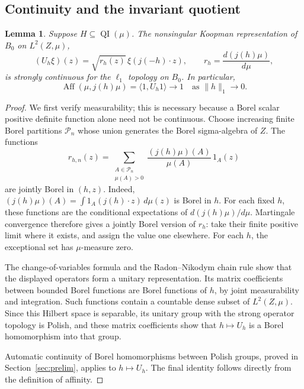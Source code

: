 \documentclass[11pt]{article}
\newtheorem{lemma}[theorem]{Lemma}
\theoremstyle{definition}
\newcommand{\Aff}{\operatorname{Aff}}
\newcommand{\QI}{\operatorname{QI}}
\begin{document}
\subsection{Continuity and the invariant quotient}

\begin{lemma}\label{lem:koopman-continuity}
Suppose $H\subseteq\QI(\mu)$. The nonsingular Koopman representation
of $B_0$ on $L^2(Z,\mu)$,
\[
 (U_h\xi)(z)
   =\sqrt{r_h(z)}\,\xi(j(-h)\cdot z),
 \qquad r_h=\frac{d(j(h)\mu)}{d\mu},
\]
is strongly continuous for the $\ell_1$ topology on $B_0$.
In particular,
\[
 \Aff(\mu,j(h)\mu)=\langle 1,U_h1\rangle\longrightarrow1
 \quad\text{as }\|h\|_1\longrightarrow0.
\]
\end{lemma}

\begin{proof}
We first verify measurability; this is necessary because a Borel scalar
positive definite function alone need not be continuous. Choose
increasing finite Borel partitions $\mathcal P_n$ whose union generates
the Borel sigma-algebra of $Z$. The functions
\[
 r_{h,n}(z)=
 \sum_{\substack{A\in\mathcal P_n\\\mu(A)>0}}
       \frac{(j(h)\mu)(A)}{\mu(A)}\,1_A(z)
\]
are jointly Borel in $(h,z)$. Indeed,
$(j(h)\mu)(A)=\int 1_A(j(h)\cdot z)\,d\mu(z)$ is Borel in $h$.
For each fixed $h$, these functions are the conditional expectations
of $d(j(h)\mu)/d\mu$. Martingale convergence therefore gives a jointly
Borel version of $r_h$: take their finite positive limit where it
exists, and assign the value one elsewhere. For each $h$, the
exceptional set has $\mu$-measure zero.

The change-of-variables formula and the Radon--Nikodym chain rule show
that the displayed operators form a unitary representation. Its matrix
coefficients between bounded Borel functions are Borel functions of
$h$, by joint measurability and integration. Such functions contain a
countable dense subset of $L^2(Z,\mu)$. Since this Hilbert space is
separable, its unitary group with the strong operator topology is
Polish, and these matrix coefficients show that $h\mapsto U_h$ is a
Borel homomorphism into that group.

Automatic continuity of Borel homomorphisms between Polish groups,
proved in Section~\ref{sec:prelim}, applies to $h\mapsto U_h$.
The final identity follows directly from the definition of affinity.
\end{proof}
\end{document}
